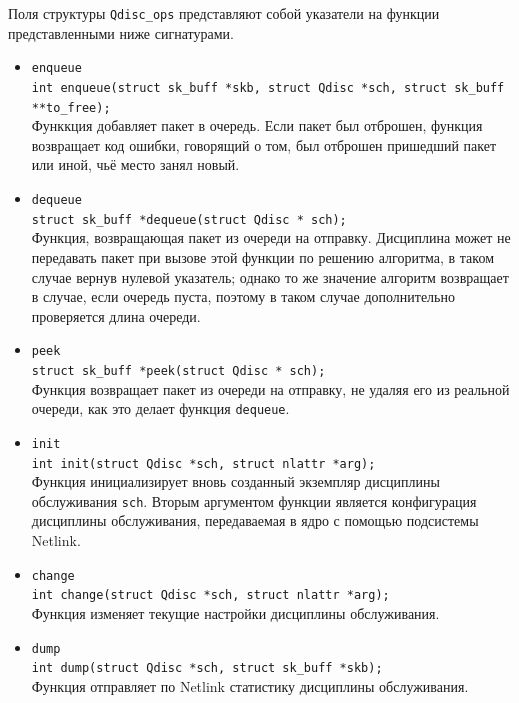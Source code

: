	Поля структуры \lstinline{Qdisc_ops} представляют собой указатели на функции 
	представленными ниже сигнатурами.
	\begin{itemize}
		\item \lstinline{enqueue}\\
   		    \lstinline{int enqueue(struct sk_buff *skb, struct Qdisc *sch, struct sk_buff **to_free);} \\
			Функкция добавляет пакет в очередь. Если пакет был отброшен, функция
			возвращает код ошибки, говорящий о том, был отброшен пришедший пакет или
			иной, чьё место занял новый.
		\item \lstinline{dequeue}\\
			\lstinline{struct sk_buff *dequeue(struct Qdisc * sch);} \\
			Функция, возвращающая пакет из очереди на отправку. Дисциплина
			может не передавать пакет при вызове этой функции по решению
			алгоритма, в таком случае вернув нулевой указатель; 
			однако то же значение алгоритм возвращает в случае, если очередь
			пуста, поэтому в таком случае дополнительно проверяется длина
			очереди.
		\item \lstinline{peek}\\
			\lstinline{struct sk_buff *peek(struct Qdisc * sch);}\\
			Функция возвращает пакет из очереди на отправку, не удаляя его из реальной очереди,
			как это делает функция \lstinline{dequeue}.
		\item \lstinline{init}\\
			  \lstinline{int init(struct Qdisc *sch, struct nlattr *arg);}\\
			  Функция инициализирует вновь созданный экземпляр дисциплины обслуживания \texttt{sch}.
			  Вторым аргументом функции является конфигурация дисциплины обслуживания, передаваемая
			  в ядро с помощью подсистемы Netlink.
		\item \lstinline{change}\\
			  \lstinline{int change(struct Qdisc *sch, struct nlattr *arg);}\\
			  Функция изменяет текущие настройки дисциплины обслуживания. 
		\item \lstinline{dump}\\
			  \lstinline{int dump(struct Qdisc *sch, struct sk_buff *skb);}\\
			  Функция отправляет по Netlink статистику дисциплины обслуживания.
	\end{itemize}

